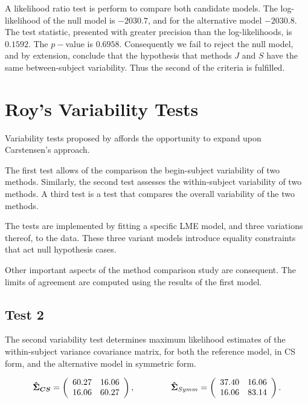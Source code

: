 A likelihood ratio test is perform to compare both candidate models. The log-likelihood of the null model is $-2030.7$, and for the alternative model $-2030.8$. The test statistic, presented with greater precision than the log-likelihoods, is $0.1592$. The $p-$value is $0.6958$. Consequently we fail to reject the null model, and by extension, conclude that the hypothesis that methods $J$ and $S$ have the same between-subject variability. Thus the second of the criteria is fulfilled.

\section{Roy's Variability Tests}
Variability tests proposed by \citet{ARoy2009} affords the opportunity to expand upon Carstensen's approach.

The first test allows of the comparison the begin-subject variability of two methods. Similarly, the second test
assesses the within-subject variability of two methods. A third test is a test that compares the overall variability of the two methods.

The tests are implemented by fitting a specific LME model, and three variations thereof, to the data. These three variant models introduce equality constraints that act null hypothesis cases.

Other important aspects of the method comparison study are consequent. The limits of agreement are computed using the results of the first model.


\subsection{Test 2}
The second variability test determines maximum likelihood estimates of the within-subject variance covariance matrix, for both the reference model, in CS form, and the alternative model in symmetric form.

\[
\boldsymbol{\hat{\Sigma}_{CS}} = \left( \begin{array}{cc}
60.27  & 16.06  \\
16.06  & 60.27  \\
\end{array}\right),
\hspace{1.5cm}
\boldsymbol{\hat{\Sigma}}_{Symm} = \left( \begin{array}{cc}
37.40 & 16.06  \\
16.06 & 83.14  \\
\end{array}\right).
\]

